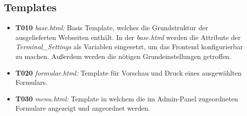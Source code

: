 \vspace{1,5cm}

\subsection{Templates}
\begin{itemize}
    \item \textbf{T010} \textit{base.html:} Basis Template, welches die Grundstruktur der ausgelieferten Webseiten enthält. In der \textit{base.html} werden die Attribute der \textit{Terminal\_Settings} als Variablen eingesetzt, um das Frontend konfigurierbar zu machen. Außerdem werden die nötigen Grundeinstellungen getroffen.
    \item \textbf{T020} \textit{formular.html:} Template für Vorschau und Druck eines ausgewählten Formulars.
    \item \textbf{T030} \textit{menu.html:} Template in welchem die im Admin-Panel zugeordneten Formulare angezeigt und angeordnet werden.
\end{itemize}
\newpage
